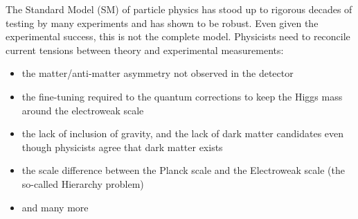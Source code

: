 The Standard Model (SM) of particle physics has stood up to rigorous decades of testing by many experiments and has shown to be robust. Even given the experimental success, this is not the complete model. Physicists need to reconcile current tensions between theory and experimental measurements:
\\
\begin{itemize}
	\setlength{\itemsep}{0em}
	\item the matter/anti-matter asymmetry not observed in the detector%
	\item the fine-tuning required to the quantum corrections to keep the Higgs mass around the electroweak scale%
	\item the lack of inclusion of gravity, and the lack of dark matter candidates even though physicists agree that dark matter exists%
	\item the scale difference between the Planck scale and the Electroweak scale (the so-called Hierarchy problem)%
	\item and many more\\%
\end{itemize}

